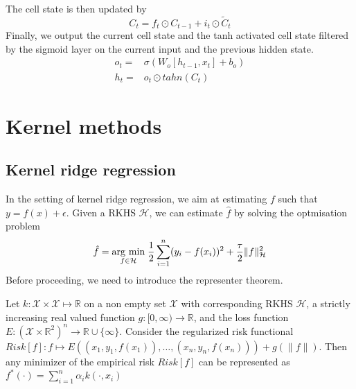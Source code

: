The cell state is then updated by
\begin{equation}
    C_t=f_t\odot C_{t-1}+i_t\odot \tilde{C}_t
\end{equation}
Finally, we output the current cell state and the tanh activated cell state filtered by the sigmoid layer on the current input and the previous hidden state.
\begin{equation}
    \begin{aligned}
    o_t=& \sigma(W_o[h_{t-1},x_t]+b_o)
    \\
    h_t=& o_t \odot tahn(C_t)
\end{aligned}
\end{equation}


\section{Kernel methods}
\subsection{Kernel ridge regression}
In the setting of kernel ridge regression, we aim at estimating $f$ such that $y=f(x)+\epsilon$. Given a RKHS $\mathcal{H}$, we can estimate $\hat{f}$ by solving the optmisation problem
\begin{equation}\label{eq:kernel ridge}
    \hat{f}=\underset{f\in \mathcal{H}}{\operatorname{arg}\,\operatorname{min}}\;\frac{1}{2}\sum\limits_{i=1}^n(y_i-f(x_i))^2+\frac{\tau}{2}\|f\|_{\mathcal{H}}^2
\end{equation}
Before proceeding, we need to introduce the representer theorem.
\begin{theorem}
    Let $k:\mathcal{X} \times \mathcal{X} \mapsto \mathbb{R}$ on a non empty set $\mathcal{X}$ with corresponding RKHS $\mathcal{H}$,
    a strictly increasing real valued function $g:[0,\infty) \to \mathbb{R}$, and the loss function $E:(\mathcal{X}\times \mathbb{R}^2)^n \to \mathbb{R} \cup \{\infty\}$.
    Consider the regularized risk functional $Risk[f]:f \mapsto  E\left((x_{1},y_{1},f(x_{1})),\ldots, (x_{n},y_{n},f(x_{n}))\right)+g\left(\| f\| \right)$. Then any minimizer of the empirical risk $Risk[f]$ can be represented as $ f^{*}(\cdot )=\sum\limits_{i=1}^{n}\alpha _{i}k(\cdot ,x_{i})$
\end{theorem}

